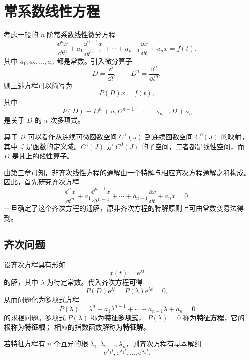 \setchapterintro{}
\chapter{常系数线性方程}\label{chap:常系数线性方程}

考虑一般的 $n$ 阶常系数线性微分方程
\[
	\dfrac{\dd^n x}{\dd t^n}
	+a_1\dfrac{\dd^{n-1}x}{\dd t^{n-1}}
	+\cdots
	+a_{n-1}\dfrac{\dd x}{\dd t}
	+a_nx=f(t),
\]
其中 $a_1,a_2,\ldots,a_n$ 都是常数。引入微分算子
\[
	D=\dfrac{\dd}{\dd t},
	\qquad
	D^n=\dfrac{\dd^n}{\dd t^n},
\]
则上述方程可以简写为
\[
	P(D)x=f(t),
\]
其中
\[
	P(D)=D^n+a_1D^{n-1}+\cdots+a_{n-1}D+a_n
\]
是关于 $D$ 的 $n$ 次多项式。

算子 $D$ 可以看作从连续可微函数空间 $C^1(J)$ 到连续函数空间
$C^0(J)$ 的映射，其中 $J$ 是函数的定义域。$C^1(J)$ 是
$C^0(J)$ 的子空间，二者都是线性空间，而 $D$ 是其上的线性算子。

由第三章可知，非齐次线性方程的通解由一个特解与相应齐次方程通解之和构成。
因此，首先研究齐次方程
\[
	\dfrac{\dd^n x}{\dd t^n}
	+a_1\dfrac{\dd^{n-1}x}{\dd t^{n-1}}
	+\cdots
	+a_{n-1}\dfrac{\dd x}{\dd t}
	+a_nx=0.
\]
一旦确定了这个齐次方程的通解，原非齐次方程的特解原则上可由常数变易法得到。

\section{齐次问题}\label{sec:常系数线性方程的齐次问题}

设齐次方程具有形如
\[
	x(t)=\mathrm{e}^{\lambda t}
\]
的解，其中 $\lambda$ 为待定常数。代入齐次方程可得
\[
	P(D)\mathrm{e}^{\lambda t}=P(\lambda)\mathrm{e}^{\lambda t}=0,
\]
从而问题化为多项式方程
\[
	P(\lambda)
	=\lambda^n+a_1\lambda^{n-1}+\cdots+a_{n-1}\lambda+a_n=0
\]
的求根问题。多项式 $P(\lambda)$ 称为\textbf{特征多项式}，
$P(\lambda)=0$ 称为\textbf{特征方程}，它的根称为\textbf{特征根}；
相应的指数函数解称为\textbf{特征解}。

\begin{theorem}\label{thm:互异特征根的基本解组}
	若特征方程有 $n$ 个互异的根
	$\lambda_1,\lambda_2,\ldots,\lambda_n$，则齐次方程有基本解组
	\[
		\mathrm{e}^{\lambda_1t},\mathrm{e}^{\lambda_2t},\ldots,\mathrm{e}^{\lambda_nt}.
	\]
\end{theorem}

